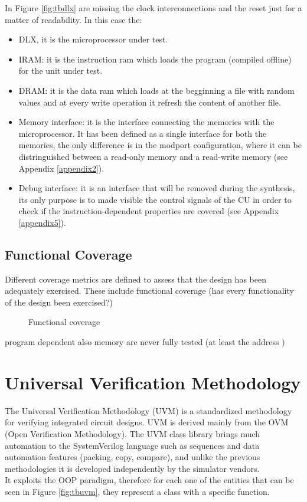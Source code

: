 In Figure \ref{fig:tbdlx} are missing the clock interconnections and the reset just for a matter of readability. In this case the:
\begin{itemize}
\item DLX, it is the microprocessor under test.
\item IRAM: it is the instruction ram which loads the program (compiled offline) for the unit under test.
\item DRAM: it is the data ram which loads at the begginning a file with random values and at every write operation it refresh the content of another file. 
\item Memory interface: it is the interface connecting the memories with the microprocessor. It has been defined as a single interface for both the memories, the only difference is in the modport configuration, where it can be distringuished between a read-only memory and a read-write memory (see Appendix \ref{appendix2}).
\item Debug interface: it is an interface that will be removed during the synthesis, its only purpose is to made visible the control signals of the CU in order to check if the instruction-dependent properties are covered (see Appendix \ref{appendix5}).
\end{itemize}


\subsection{Functional Coverage}

Different coverage metrics are defined to assess that the design has been adequately exercised. These include functional coverage (has every functionality of the design been exercised?)

\begin{figure}[!htbp]
\centering
\captionsetup{justification=centering}
\caption{Functional coverage}
\label{fig:dlxarch}
\end{figure}

program dependent 
also memory are never fully tested (at least the address ) 

\newpage
\section{Universal Verification Methodology}
The Universal Verification Methodology (UVM) is a standardized methodology for verifying integrated circuit designs. UVM is derived mainly from the OVM (Open Verification Methodology). The UVM class library brings much automation to the SystemVerilog language such as sequences and data automation features (packing, copy, compare), and unlike the previous methodologies it is developed independently by the simulator vendors.\\ 
It exploits the OOP paradigm, therefore for each one of the entities that can be seen in Figure \ref{fig:tbuvm}, they represent a class with a specific function.

